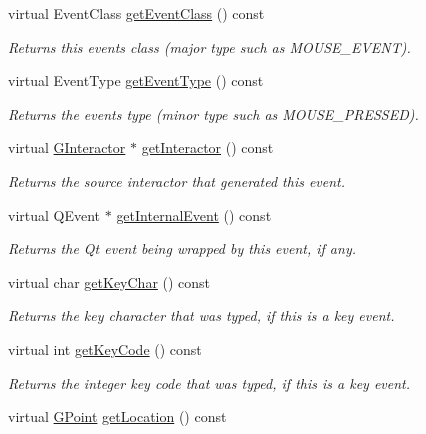 \begin{DoxyCompactItemize}
virtual Event\+Class \mbox{\hyperlink{classGEvent_a84e9319971c682404ea8f030cfee38f9}{get\+Event\+Class}} () const
\begin{DoxyCompactList}\small\item\em Returns this event\textquotesingle{}s class (major type such as M\+O\+U\+S\+E\+\_\+\+E\+V\+E\+NT). \end{DoxyCompactList}\item 
virtual Event\+Type \mbox{\hyperlink{classGEvent_a404fe4b126a8443600109a62ef7ce6a2}{get\+Event\+Type}} () const
\begin{DoxyCompactList}\small\item\em Returns the event\textquotesingle{}s type (minor type such as M\+O\+U\+S\+E\+\_\+\+P\+R\+E\+S\+S\+ED). \end{DoxyCompactList}\item 
virtual \mbox{\hyperlink{classGInteractor}{G\+Interactor}} $\ast$ \mbox{\hyperlink{classGEvent_ac8998a7ac699a98fbdc125ef0f3d64f1}{get\+Interactor}} () const
\begin{DoxyCompactList}\small\item\em Returns the source interactor that generated this event. \end{DoxyCompactList}\item 
virtual Q\+Event $\ast$ \mbox{\hyperlink{classGEvent_ab3589ee7d7005f6a323ff2c968f82038}{get\+Internal\+Event}} () const
\begin{DoxyCompactList}\small\item\em Returns the Qt event being wrapped by this event, if any. \end{DoxyCompactList}\item 
virtual char \mbox{\hyperlink{classGEvent_ab23396e09d92df320d2324b47a0766e8}{get\+Key\+Char}} () const
\begin{DoxyCompactList}\small\item\em Returns the key character that was typed, if this is a key event. \end{DoxyCompactList}\item 
virtual int \mbox{\hyperlink{classGEvent_a71429f4b3c8f3c5097fe39e50501bbb6}{get\+Key\+Code}} () const
\begin{DoxyCompactList}\small\item\em Returns the integer key code that was typed, if this is a key event. \end{DoxyCompactList}\item 
virtual \mbox{\hyperlink{structGPoint}{G\+Point}} \mbox{\hyperlink{classGEvent_a4f83802015511edeb63b892830812c11}{get\+Location}} () const

\end{DoxyCompactItemize}
